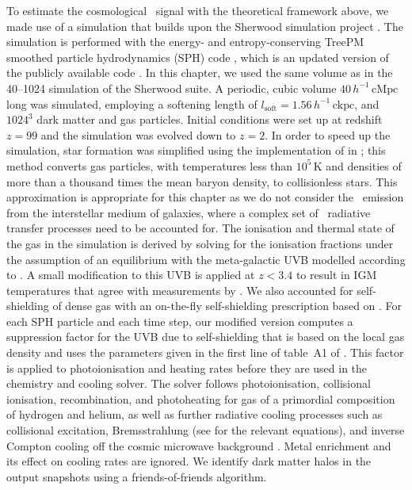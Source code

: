 To estimate the cosmological \lya\ signal with the theoretical framework above, we made use of a simulation that builds upon the Sherwood simulation project \citep{2017MNRAS.464..897B}. The simulation is performed with the energy- and entropy-conserving TreePM smoothed particle hydrodynamics (SPH) code , which is an updated version of the publicly available  code \citep{2001NewA....6...79S, 2005MNRAS.364.1105S}. In this chapter, we used the same volume as in the 40--1024 simulation of the Sherwood suite. A periodic, cubic volume $40 \, h^{-1} \, \mathrm{cMpc}$ long was simulated, employing a softening length of $l_\mathrm{soft}=1.56 \, h^{-1} \, \mathrm{ckpc}$, and $1024^3$ dark matter and gas particles. Initial conditions were set up at redshift $z=99$ and the simulation was evolved down to $z=2$. In order to speed up the simulation, star formation was simplified using the implementation of \citet{2004MNRAS.354..684V} in ; this method converts gas particles, with temperatures less than $10^5 \, \mathrm{K}$ and densities of more than a thousand times the mean baryon density, to collisionless stars. This approximation is appropriate for this chapter as we do not consider the \lya\ emission from the interstellar medium of galaxies, where a complex set of \lya\ radiative transfer processes need to be accounted for. The ionisation and thermal state of the gas in the simulation is derived by solving for the ionisation fractions under the assumption of an equilibrium with the meta-galactic UVB modelled according to . A small modification to this UVB is applied at $z<3.4$ \citep[see][]{2017MNRAS.464..897B} to result in IGM temperatures that agree with measurements by \citet{2011MNRAS.410.1096B}. We also accounted for self-shielding of dense gas with an on-the-fly self-shielding prescription based on \citet{2013MNRAS.430.2427R}. For each SPH particle and each time step, our modified  version computes a suppression factor for the UVB due to self-shielding that is based on the local gas density and uses the parameters given in the first line of table~A1 of \citet{2013MNRAS.430.2427R}. This factor is applied to photoionisation and heating rates before they are used in the chemistry and cooling solver. The solver follows photoionisation, collisional ionisation, recombination, and photoheating for gas of a primordial composition of hydrogen and helium, as well as further radiative cooling processes such as collisional excitation, Bremsstrahlung (see \citealt{1996ApJS..105...19K} for the relevant equations), and inverse Compton cooling off the cosmic microwave background \citep{1986ApJ...301..522I}. Metal enrichment and its effect on cooling rates are ignored. We identify dark matter halos in the output snapshots using a friends-of-friends algorithm.

